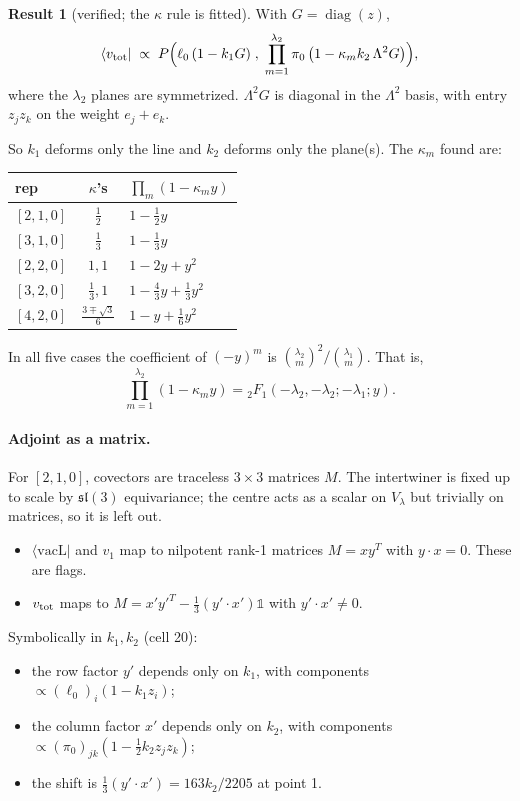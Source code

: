 \documentclass[11pt]{article}
\newcommand{\vacL}{\langle\mathrm{vacL}|}
\theoremstyle{definition}
\newtheorem{result}{Result}
\theoremstyle{remark}
\begin{document}
\begin{result}[verified; the $\kappa$ rule is fitted]\label{res:bw}
With $G=\operatorname{diag}(z)$,
\begin{equation}
\langle v_{\rm tot}|\;\propto\;P\Big(\ell_0\,(1-k_1G)\;,\;\prod_{m=1}^{\lambda_2}\pi_0\,\big(1-\kappa_m k_2\,\Lambda^2G\big)\Big),
\end{equation}
where the $\lambda_2$ planes are symmetrized. $\Lambda^2G$ is diagonal in the $\Lambda^2$ basis, with entry $z_jz_k$ on the weight $e_j+e_k$.

So $k_1$ deforms only the line and $k_2$ deforms only the plane(s). The $\kappa_m$ found are:
\begin{center}
\begin{tabular}{lcl}\toprule
rep & $\kappa$'s & $\prod_m(1-\kappa_m y)$\\\midrule
$[2,1,0]$ & $\tfrac12$ & $1-\tfrac12y$\\
$[3,1,0]$ & $\tfrac13$ & $1-\tfrac13y$\\
$[2,2,0]$ & $1,1$ & $1-2y+y^2$\\
$[3,2,0]$ & $\tfrac13,1$ & $1-\tfrac43y+\tfrac13y^2$\\
$[4,2,0]$ & $\tfrac{3\mp\sqrt3}{6}$ & $1-y+\tfrac16y^2$\\\bottomrule
\end{tabular}
\end{center}
In all five cases the coefficient of $(-y)^m$ is $\binom{\lambda_2}{m}^2/\binom{\lambda_1}{m}$. That is,
\begin{equation}\label{eq:2F1}
\prod_{m=1}^{\lambda_2}(1-\kappa_m y)={}_2F_1(-\lambda_2,-\lambda_2;-\lambda_1;y).
\end{equation}
\end{result}

\paragraph{Adjoint as a matrix.}
For $[2,1,0]$, covectors are traceless $3\times3$ matrices $M$. The intertwiner is fixed up to scale by $\mathfrak{sl}(3)$ equivariance; the centre acts as a scalar on $V_\lambda$ but trivially on matrices, so it is left out.
\begin{itemize}
\item $\vacL$ and $v_1$ map to nilpotent rank-1 matrices $M=xy^T$ with $y\cdot x=0$. These are flags.
\item $v_{\rm tot}$ maps to $M=x'y'^T-\tfrac13(y'\!\cdot x')\mathbb 1$ with $y'\!\cdot x'\neq0$.
\end{itemize}
Symbolically in $k_1,k_2$ (cell 20):
\begin{itemize}
\item the row factor $y'$ depends only on $k_1$, with components $\propto(\ell_0)_i(1-k_1z_i)$;
\item the column factor $x'$ depends only on $k_2$, with components $\propto(\pi_0)_{jk}(1-\tfrac12k_2z_jz_k)$;
\item the shift is $\tfrac13(y'\!\cdot x')=163k_2/2205$ at point 1.
\end{itemize}
\end{document}

